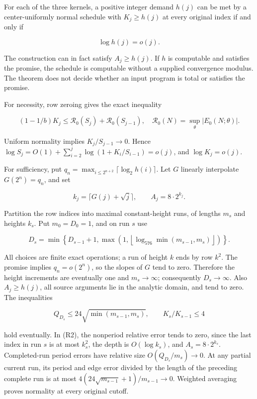 \documentclass[11pt,a4paper]{article}
\begin{document}
For each of the three kernels, a positive integer demand \(h(j)\) can be
met by a center-uniformly normal schedule with \(K_j\ge h(j)\) at every
original index if and only if

\[
\log h(j)=o(j).
\tag{R4}
\]

The construction can in fact satisfy \(A_j\ge h(j)\). If \(h\) is
computable and satisfies the promise, the schedule is computable without
a supplied convergence modulus. The theorem does not decide whether an
input program is total or satisfies the promise.

For necessity, row zeroing gives the exact inequality

\[
(1-1/b)K_j\le \mathcal R_0(S_j)+\mathcal R_0(S_{j-1}),
\quad \mathcal R_0(N)=\sup_\theta|E_0(N;\theta)|.
\]

Uniform normality implies \(K_j/S_{j-1}\to0\). Hence
\(\log S_j=O(1)+\sum_{i=2}^j\log(1+K_i/S_{i-1})=o(j)\), and
\(\log K_j=o(j)\).

For sufficiency, put \(q_n=\max_{i\le2^{n+2}}\lceil\log_2h(i)\rceil\).
Let \(G\) linearly interpolate \(G(2^n)=q_n\), and set

\[
k_j=\lceil G(j)+\sqrt j\rceil,\qquad A_j=8\cdot2^{k_j}.
\]

Partition the row indices into maximal constant-height runs, of lengths
\(m_s\) and heights \(k_s\). Put \(m_0=D_0=1\), and on run \(s\) use

\[
D_s=\min\left\lbrace D_{s-1}+1,
\max\left(1,\left\lfloor\log_{576}\min(m_{s-1},m_s)\right\rfloor\right)\right\rbrace .
\]

All choices are finite exact operations; a run of height \(k\) ends by
row \(k^2\). The promise implies \(q_n=o(2^n)\), so the slopes of \(G\)
tend to zero. Therefore the height increments are eventually one and
\(m_s\to\infty\); consequently \(D_s\to\infty\). Also \(A_j\ge h(j)\),
all source arguments lie in the analytic domain, and tend to zero. The
inequalities

\[
Q_{D_s}\le24\sqrt{\min(m_{s-1},m_s)},\qquad
K_s/K_{s-1}\le4
\]

hold eventually. In (R2), the nonperiod relative error tends to zero,
since the last index in run \(s\) is at most \(k_s^2\), the depth is
\(O(\log k_s)\), and \(A_s=8\cdot2^{k_s}\). Completed-run period errors
have relative size \(O(Q_{D_s}/m_s)\to0\). At any partial current run,
its period and edge error divided by the length of the preceding
complete run is at most \(4(24\sqrt{m_{s-1}}+1)/m_{s-1}\to0\). Weighted
averaging proves normality at every original cutoff.
\end{document}
